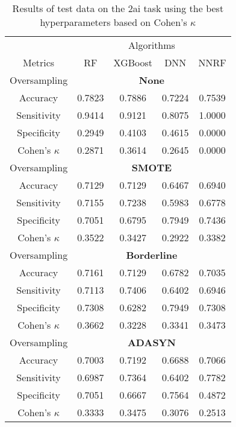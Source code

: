 \begin{table}[!htb]
\centering
\caption{Results of test data on the 2ai task using the best hyperparameters based on Cohen's $\kappa$}
\label{tab:2ai_test_results}
\begin{tabular}{c | c c c c}
\hline
 & \multicolumn{4}{c}{Algorithms}\\ 
Metrics &RF & XGBoost & DNN & NNRF\\ 
\hline
Oversampling &\multicolumn{4}{|c}{\textbf{None}}\\ 
\hline
Accuracy & 0.7823 & 0.7886 & 0.7224 & 0.7539\\ 
Sensitivity & 0.9414 & 0.9121 & 0.8075 & 1.0000\\ 
Specificity & 0.2949 & 0.4103 & 0.4615 & 0.0000\\ 
Cohen's $\kappa$ & 0.2871 & 0.3614 & 0.2645 & 0.0000\\ 
\hline
Oversampling &\multicolumn{4}{|c}{\textbf{SMOTE}}\\ 
\hline
Accuracy & 0.7129 & 0.7129 & 0.6467 & 0.6940\\ 
Sensitivity & 0.7155 & 0.7238 & 0.5983 & 0.6778\\ 
Specificity & 0.7051 & 0.6795 & 0.7949 & 0.7436\\ 
Cohen's $\kappa$ & 0.3522 & 0.3427 & 0.2922 & 0.3382\\ 
\hline
Oversampling &\multicolumn{4}{|c}{\textbf{Borderline}}\\ 
\hline
Accuracy & 0.7161 & 0.7129 & 0.6782 & 0.7035\\ 
Sensitivity & 0.7113 & 0.7406 & 0.6402 & 0.6946\\ 
Specificity & 0.7308 & 0.6282 & 0.7949 & 0.7308\\ 
Cohen's $\kappa$ & 0.3662 & 0.3228 & 0.3341 & 0.3473\\ 
\hline
Oversampling &\multicolumn{4}{|c}{\textbf{ADASYN}}\\ 
\hline
Accuracy & 0.7003 & 0.7192 & 0.6688 & 0.7066\\ 
Sensitivity & 0.6987 & 0.7364 & 0.6402 & 0.7782\\ 
Specificity & 0.7051 & 0.6667 & 0.7564 & 0.4872\\ 
Cohen's $\kappa$ & 0.3333 & 0.3475 & 0.3076 & 0.2513\\ 
\hline
\end{tabular}
\end{table}

